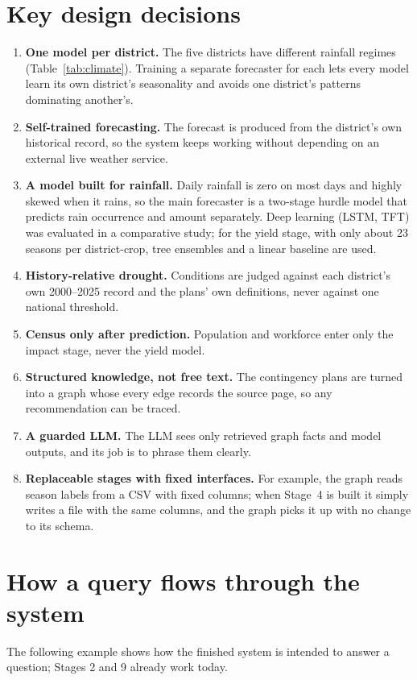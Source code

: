 \section{Key design decisions}
\begin{enumerate}
	\item \textbf{One model per district.} The five districts have different rainfall regimes (Table~\ref{tab:climate}). Training a separate forecaster for each lets every model learn its own district's seasonality and avoids one district's patterns dominating another's.
	\item \textbf{Self-trained forecasting.} The forecast is produced from the district's own historical record, so the system keeps working without depending on an external live weather service.
	\item \textbf{A model built for rainfall.} Daily rainfall is zero on most days and highly skewed when it rains, so the main forecaster is a two-stage hurdle model that predicts rain occurrence and amount separately. Deep learning (LSTM, TFT) was evaluated in a comparative study; for the yield stage, with only about 23 seasons per district-crop, tree ensembles and a linear baseline are used.
	\item \textbf{History-relative drought.} Conditions are judged against each district's own 2000--2025 record and the plans' own definitions, never against one national threshold.
	\item \textbf{Census only after prediction.} Population and workforce enter only the impact stage, never the yield model.
	\item \textbf{Structured knowledge, not free text.} The contingency plans are turned into a graph whose every edge records the source page, so any recommendation can be traced.
	\item \textbf{A guarded LLM.} The LLM sees only retrieved graph facts and model outputs, and its job is to phrase them clearly.
	\item \textbf{Replaceable stages with fixed interfaces.} For example, the graph reads season labels from a CSV with fixed columns; when Stage~4 is built it simply writes a file with the same columns, and the graph picks it up with no change to its schema.
\end{enumerate}

\section{How a query flows through the system}
The following example shows how the finished system is intended to answer a question; Stages 2 and 9 already work today.

